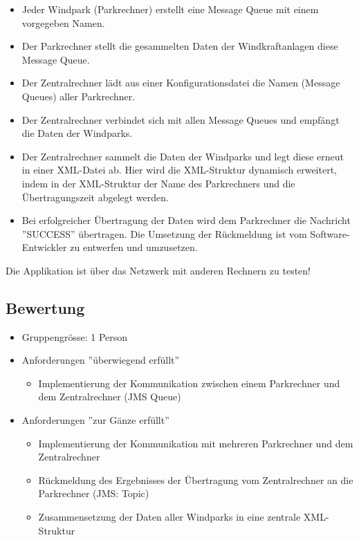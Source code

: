 \begin{itemize}
    \item Jeder Windpark (Parkrechner) erstellt eine Message Queue mit einem vorgegeben Namen.
    \item Der Parkrechner stellt die gesammelten Daten der Windkraftanlagen diese Message Queue.
    \item Der Zentralrechner lädt aus einer Konfigurationsdatei die Namen (Message Queues) aller Parkrechner.
    \item Der Zentralrechner verbindet sich mit allen Message Queues und empfängt die Daten der Windparks.
    \item Der Zentralrechner sammelt die Daten der Windparks und legt diese erneut in einer XML-Datei ab. Hier wird die XML-Struktur dynamisch erweitert, indem in der XML-Struktur der Name des Parkrechners und die Übertragungszeit abgelegt werden.
    \item Bei erfolgreicher Übertragung der Daten wird dem Parkrechner die Nachricht ''SUCCESS'' übertragen. Die Umsetzung der Rückmeldung ist vom Software-Entwickler zu entwerfen und umzusetzen.
\end{itemize}

Die Applikation ist über das Netzwerk mit anderen Rechnern zu testen!

\subsection{Bewertung}

\begin{itemize}
    \item Gruppengrösse: 1 Person
    \item Anforderungen ''überwiegend erfüllt''
    \begin{itemize}
        \item Implementierung der Kommunikation zwischen einem Parkrechner und dem Zentralrechner (JMS Queue)
    \end{itemize}
    \item Anforderungen ''zur Gänze erfüllt''
    \begin{itemize}
        \item Implementierung der Kommunikation mit mehreren Parkrechner und dem Zentralrechner
        \item Rückmeldung des Ergebnisses der Übertragung vom Zentralrechner an die Parkrechner (JMS: Topic)
        \item Zusammensetzung der Daten aller Windparks in eine zentrale XML-Struktur
    \end{itemize}
\end{itemize}


